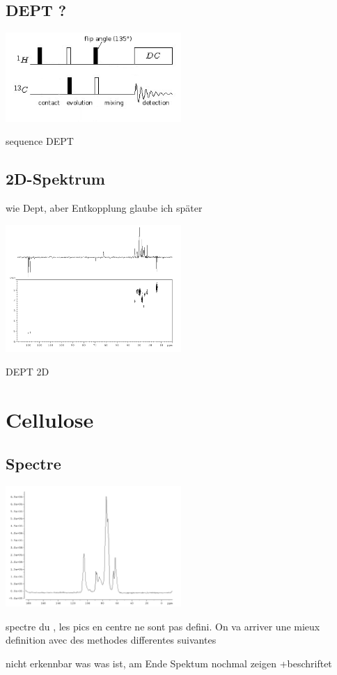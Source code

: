 \documentclass[a4paper,12pt]{scrartcl}
\begin{document}
  \subsection{DEPT ?}
\begin{figurehere}
    \center
    \includegraphics[width=0.5\textwidth]{bilder/DEPT.png}
    \caption{sequence DEPT}
   \end{figurehere}  

  \subsection{2D-Spektrum}
   wie Dept, aber Entkopplung glaube ich später
  \begin{figurehere}
    \center
    \includegraphics[width=0.5\textwidth]{bilder/dept_2d.png}
    \caption{DEPT 2D}
   \end{figurehere}
 

 \section{Cellulose}
  \subsection{Spectre }
 \begin{figurehere}
    \center
    \includegraphics[width=0.5\textwidth]{bilder/c13_spektum.png}
    \caption{spectre du , les pics en centre ne sont pas defini. On va arriver une mieux definition avec des methodes differentes suivantes}
   \end{figurehere}
   nicht erkennbar was was ist, am Ende Spektum nochmal zeigen +beschriftet  
\end{document}
